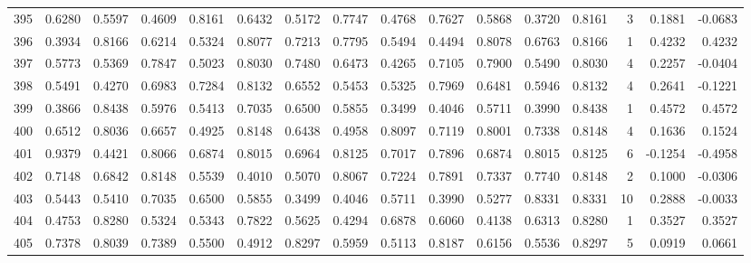 \begin{tabular}{lrrrrrrrrrrrrrrr}
395 &      0.6280 &  0.5597 &  0.4609 &  0.8161 &  0.6432 &  0.5172 &  0.7747 &  0.4768 &  0.7627 &  0.5868 &   0.3720 &     0.8161 &      3 &                    0.1881 &                    -0.0683 \\
396 &      0.3934 &  0.8166 &  0.6214 &  0.5324 &  0.8077 &  0.7213 &  0.7795 &  0.5494 &  0.4494 &  0.8078 &   0.6763 &     0.8166 &      1 &                    0.4232 &                     0.4232 \\
397 &      0.5773 &  0.5369 &  0.7847 &  0.5023 &  0.8030 &  0.7480 &  0.6473 &  0.4265 &  0.7105 &  0.7900 &   0.5490 &     0.8030 &      4 &                    0.2257 &                    -0.0404 \\
398 &      0.5491 &  0.4270 &  0.6983 &  0.7284 &  0.8132 &  0.6552 &  0.5453 &  0.5325 &  0.7969 &  0.6481 &   0.5946 &     0.8132 &      4 &                    0.2641 &                    -0.1221 \\
399 &      0.3866 &  0.8438 &  0.5976 &  0.5413 &  0.7035 &  0.6500 &  0.5855 &  0.3499 &  0.4046 &  0.5711 &   0.3990 &     0.8438 &      1 &                    0.4572 &                     0.4572 \\
400 &      0.6512 &  0.8036 &  0.6657 &  0.4925 &  0.8148 &  0.6438 &  0.4958 &  0.8097 &  0.7119 &  0.8001 &   0.7338 &     0.8148 &      4 &                    0.1636 &                     0.1524 \\
401 &      0.9379 &  0.4421 &  0.8066 &  0.6874 &  0.8015 &  0.6964 &  0.8125 &  0.7017 &  0.7896 &  0.6874 &   0.8015 &     0.8125 &      6 &                   -0.1254 &                    -0.4958 \\
402 &      0.7148 &  0.6842 &  0.8148 &  0.5539 &  0.4010 &  0.5070 &  0.8067 &  0.7224 &  0.7891 &  0.7337 &   0.7740 &     0.8148 &      2 &                    0.1000 &                    -0.0306 \\
403 &      0.5443 &  0.5410 &  0.7035 &  0.6500 &  0.5855 &  0.3499 &  0.4046 &  0.5711 &  0.3990 &  0.5277 &   0.8331 &     0.8331 &     10 &                    0.2888 &                    -0.0033 \\
404 &      0.4753 &  0.8280 &  0.5324 &  0.5343 &  0.7822 &  0.5625 &  0.4294 &  0.6878 &  0.6060 &  0.4138 &   0.6313 &     0.8280 &      1 &                    0.3527 &                     0.3527 \\
405 &      0.7378 &  0.8039 &  0.7389 &  0.5500 &  0.4912 &  0.8297 &  0.5959 &  0.5113 &  0.8187 &  0.6156 &   0.5536 &     0.8297 &      5 &                    0.0919 &                     0.0661 \\

\end{tabular}
